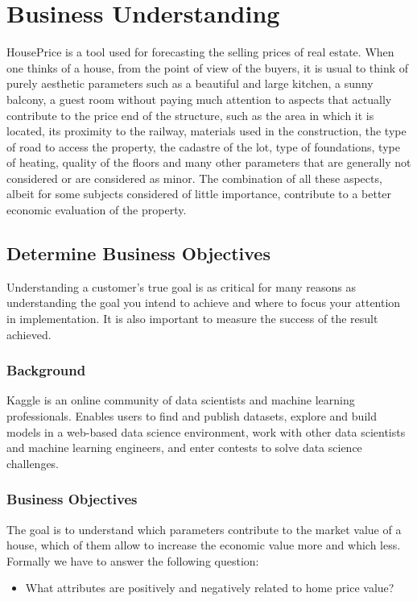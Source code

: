 \chapter{Business Understanding}

HousePrice is a tool used for forecasting the selling prices of real estate. When one thinks of a house, from the point of view of the buyers, it is usual to think of purely aesthetic parameters such as a beautiful and large kitchen, a sunny balcony, a guest room without paying much attention to aspects that actually contribute to the price end of the structure, such as the area in which it is located, its proximity to the railway, materials used in the construction, the type of road to access the property, the cadastre of the lot, type of foundations, type of heating, quality of the floors and many other parameters that are generally not considered or are considered as minor. The combination of all these aspects, albeit for some subjects considered of little importance, contribute to a better economic evaluation of the property.



\section{Determine Business Objectives}
Understanding a customer's true goal is as critical for many reasons as understanding the goal you intend to achieve and where to focus your attention in implementation. It is also important to measure the success of the result achieved.

\subsection{Background}
Kaggle is an online community of data scientists and machine learning professionals. Enables users to find and publish datasets, explore and build models in a web-based data science environment, work with other data scientists and machine learning engineers, and enter contests to solve data science challenges.

\subsection{Business Objectives}
The goal is to understand which parameters contribute to the market value of a house, which of them allow to increase the economic value more and which less. Formally we have to answer the following question:
\begin{itemize}
    \item What attributes are positively and negatively related to home price value?
\end{itemize}

